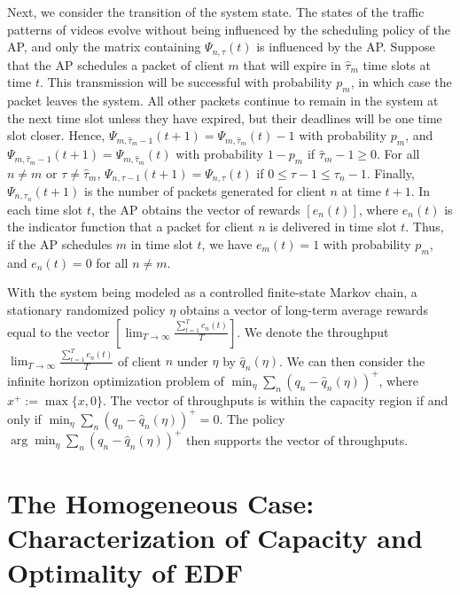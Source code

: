 \documentclass[10pt,nocopyrightspace]{sigplan-proc-varsize-1in}
\begin{document}
Next, we consider the transition of the system state. The states of the traffic patterns of videos evolve without being influenced by the scheduling policy of the AP, and only the matrix containing $\Psi_{n,\tau}(t)$ is influenced by the AP. Suppose that the AP schedules a packet of client $m$ that will expire in $\hat{\tau}_m$ time slots at time $t$. This transmission will be successful with probability $p_m$, in which case the packet leaves the system. All other packets continue to remain in the system at the next time slot unless they have expired, but their deadlines will be one time slot closer. Hence, $\Psi_{m,\hat{\tau}_m-1}(t+1) = \Psi_{m,\hat{\tau}_m}(t)-1$ with probability $p_m$, and $\Psi_{m,\hat{\tau}_m-1}(t+1) = \Psi_{m,\hat{\tau}_m}(t)$ with probability $1-p_m$ if $\hat{\tau}_m-1\geq 0$. For all $n\neq m$ or $\tau\neq \hat{\tau}_m$, $\Psi_{n,\tau-1}(t+1)=\Psi_{n,\tau}(t)$ if $0\leq \tau - 1\leq \tau_n-1$. Finally, $\Psi_{n,\tau_n}(t+1)$ is the number of packets generated for client $n$ at time $t+1$. In each time slot $t$, the AP obtains the vector of rewards $[e_n(t)]$, where $e_n(t)$ is the indicator function that a packet for client $n$ is delivered in time slot $t$. Thus, if the AP schedules $m$ in time slot $t$, we have $e_m(t)=1$ with probability $p_m$, and $e_n(t)=0$ for all $n\neq m$.

With the system being modeled as a controlled finite-state Markov chain, a stationary randomized policy $\eta$ obtains a vector of long-term average rewards equal to the vector $[\lim_{T\rightarrow\infty}\frac{\sum_{t=1}^Te_n(t)}{T}]$. We denote the throughput  $\lim_{T\rightarrow\infty}\frac{\sum_{t=1}^Te_n(t)}{T}$ of client $n$ under $\eta$ by $\hat{q}_n(\eta)$. We can then consider the infinite horizon optimization problem of $\min_\eta \sum_n(q_n-\hat{q}_n(\eta))^+$, where $x^+:=\max\{x,0\}$. The vector of throughputs is within the capacity region if and only if $\min_\eta \sum_n(q_n-\hat{q}_n(\eta))^+=0$. The policy $\arg\min_\eta \sum_n(q_n-\hat{q}_n(\eta))^+$ then supports the vector of throughputs.

\section{The Homogeneous Case: Characterization of Capacity and Optimality of EDF}
\end{document}
